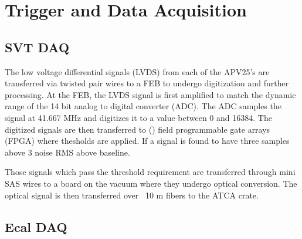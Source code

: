 \section{Trigger and Data Acquisition}
 
\subsection{SVT DAQ}


The low voltage differential signals (LVDS) from each of the APV25's are 
transferred via twisted pair wires to a FEB to undergo digitization
and further processing.  At the FEB, the LVDS signal is first amplified to match
the dynamic range of the 14 bit analog to digital converter (ADC). The ADC 
samples the signal at 41.667 MHz and digitizes it to a value between 0 and 
16384.  The digitized signals are then transferred to () field programmable gate
arrays (FPGA) where thesholds are applied. If a signal is found to have three
samples above 3 noise RMS above baseline.


 Those signals which pass the threshold requirement are transferred through 
 mini SAS wires to a board on the vacuum  where they undergo optical conversion.
The optical signal is then transferred over ~10 m fibers to the ATCA crate.


\subsection{Ecal DAQ}



